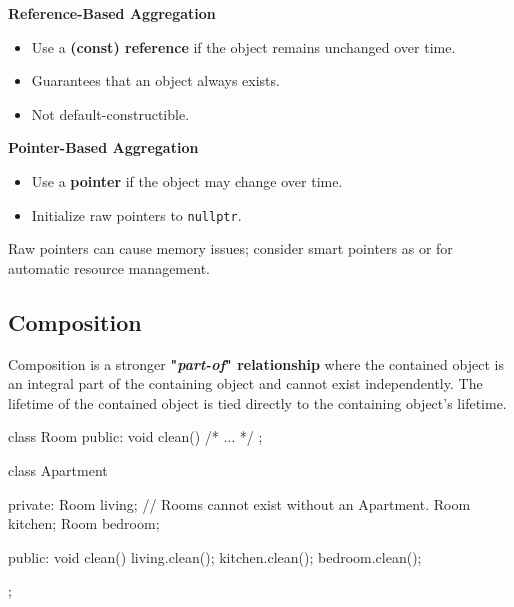 \begin{minipage}[H]{0.48\textwidth}
    \textbf{Reference-Based Aggregation}
    \begin{itemize}
        \item Use a \textbf{(const) reference} if the object remains unchanged over time.
        \item Guarantees that an object always exists.
        \item Not default-constructible.
    \end{itemize}
\end{minipage}%
\hfill
\begin{minipage}[H]{0.48\textwidth}
    \textbf{Pointer-Based Aggregation}
    \begin{itemize}
        \item Use a \textbf{pointer} if the object may change over time.
        \item Initialize raw pointers to \texttt{nullptr}.
    \end{itemize}
\end{minipage}

\begin{observationblock}
    Raw pointers can cause memory issues; consider smart pointers as  or  for automatic resource management.
\end{observationblock}

\subsection{Composition}

Composition is a stronger \textbf{"\textit{part-of}" relationship} where the contained object is an integral part of the containing object and cannot exist independently. The lifetime of the contained object is tied directly to the containing object's lifetime.

\vspace{-0.5em}

\begin{codeblock}[language=C++]
class Room {
public:
    void clean() { /* ... */ }
};

class Apartment {
private:
    Room living;  // Rooms cannot exist without an Apartment.
    Room kitchen;
    Room bedroom;

public:
    void clean() { 
        living.clean(); 
        kitchen.clean(); 
        bedroom.clean(); 
    }
};
\end{codeblock}

